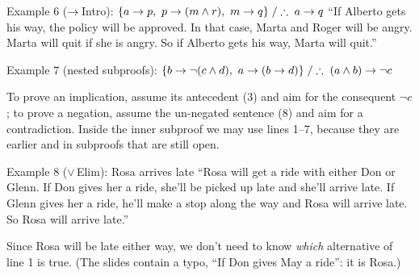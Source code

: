 \begin{nbexample}{Example 6 ($\rightarrow$\,Intro): $\{a \rightarrow p,\ p \rightarrow (m \land r),\ m \rightarrow q\} \;/\therefore\; a \rightarrow q$}
``If Alberto gets his way, the policy will be approved. In that case, Marta and Roger will
be angry. Marta will quit if she is angry. So if Alberto gets his way, Marta will quit.''
\begin{fitchproof}
 \RPrem
{} \RPrem
{} \RPrem
\open
{} \RAss
{} 
 
 
 
\close
{} 
\end{fitchproof}
\end{nbexample}

\begin{nbexample}{Example 7 (nested subproofs): $\{b \rightarrow \neg(c \land d),\ a \rightarrow (b \rightarrow d)\} \;/\therefore\; (a \land b) \rightarrow \neg c$}
\begin{fitchproof}
 \RPrem
{} \RPrem
\open
{} \RAss
{} 
 
 
 
\open
{} \RAss
{} 
 
\close
{} 
\close
{} 
\end{fitchproof}
To prove an implication, assume its antecedent (3) and aim for the consequent $\neg c$; to
prove a negation, assume the un-negated sentence (8) and aim for a contradiction. Inside
the inner subproof we may use lines 1--7, because they are earlier and in subproofs that
are still open.
\end{nbexample}

\begin{nbexample}{Example 8 ($\lor$\,Elim): Rosa arrives late}
``Rosa will get a ride with either Don or Glenn. If Don gives her a ride, she'll be picked up
late and she'll arrive late. If Glenn gives her a ride, he'll make a stop along the way and
Rosa will arrive late. So Rosa will arrive late.''
\begin{fitchproof}
 \RPrem
{} \RPrem
{} \RPrem
\open
{} \RAss
{} 
 
\close
\open
{} \RAss
{} 
 
\close
{} 
\end{fitchproof}
Since Rosa will be late either way, we don't need to know \emph{which} alternative of line
1 is true. (The slides contain a typo, ``If Don gives May a ride'': it is Rosa.)
\end{nbexample}

